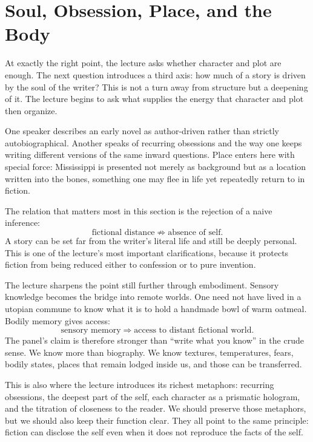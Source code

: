 \section{Soul, Obsession, Place, and the Body}

At exactly the right point, the lecture asks whether character and plot are enough. The next question introduces a third axis: how much of a story is driven by the soul of the writer? This is not a turn away from structure but a deepening of it. The lecture begins to ask what supplies the energy that character and plot then organize.

One speaker describes an early novel as author-driven rather than strictly autobiographical. Another speaks of recurring obsessions and the way one keeps writing different versions of the same inward questions. Place enters here with special force: Mississippi is presented not merely as background but as a location written into the bones, something one may flee in life yet repeatedly return to in fiction.

The relation that matters most in this section is the rejection of a naive inference:
\begin{equation}
\text{fictional distance} \not\Rightarrow \text{absence of self}.
\end{equation}
A story can be set far from the writer's literal life and still be deeply personal. This is one of the lecture's most important clarifications, because it protects fiction from being reduced either to confession or to pure invention.

The lecture sharpens the point still further through embodiment. Sensory knowledge becomes the bridge into remote worlds. One need not have lived in a utopian commune to know what it is to hold a handmade bowl of warm oatmeal. Bodily memory gives access:
\begin{equation}
\text{sensory memory} \Rightarrow \text{access to distant fictional world}.
\end{equation}
The panel's claim is therefore stronger than ``write what you know'' in the crude sense. We know more than biography. We know textures, temperatures, fears, bodily states, places that remain lodged inside us, and those can be transferred.

This is also where the lecture introduces its richest metaphors: recurring obsessions, the deepest part of the self, each character as a prismatic hologram, and the titration of closeness to the reader. We should preserve those metaphors, but we should also keep their function clear. They all point to the same principle: fiction can disclose the self even when it does not reproduce the facts of the self.

